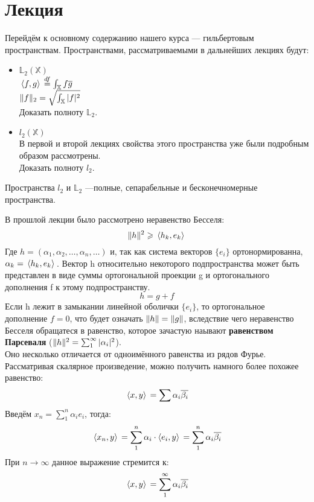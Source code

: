 	\section{Лекция}
	
	Перейдём к основному содержанию нашего курса --- гильбертовым пространствам. Пространствами, рассматриваемыми 
	в дальнейших лекциях будут:
	\begin{itemize}
		\item $\mathbb{L}_2(\mathbb{X})$ \\
		$\, \langle f, g \rangle \, \overset{df}{=} \int_{\mathbb{X}} f\overline{g}$ \\
		$\| f \|_2 = \sqrt{\int_{\mathbb{X}} |f|^2}$ \\
		\exc Доказать полноту $\mathbb{L}_2$.
		
		\item $l_2(\mathbb{X})$ \\
		В первой и второй лекциях свойства этого пространства уже были подробным образом рассмотрены. \\
		\exc Доказать полноту $l_2$.
	\end{itemize}
	Пространства $l_2$ и $\mathbb{L}_2$ ---полные, сепарабельные и бесконечномерные пространства.
	
	В прошлой лекции было рассмотрено неравенство Бесселя: \\
	$$\| h \|^2 \geqslant \, \langle h_k, e_k \rangle \,$$
	Где $h = (\alpha_1, \alpha_2, \ldots, \alpha_n, \ldots)$ и, так как система векторов $\{ e_i \}$ ортонормированна, 
	$\alpha_k = \, \langle h_k, e_k \rangle \,$. Вектор h относительно некоторого подпространства может быть представлен в виде суммы
	ортогональной проекции g и ортогонального дополнения f к этому подпространству. 
	$$h = g + f$$
	Если h лежит в замыкании линейной оболички $\{ e_i \}$, то ортогональное дополнение $f = 0$, что будет означать 
	$\| h \| = \| g \|$, вследствие чего неравенство Бесселя обращатеся в равенство, которое зачастую наывают 
	\textbf{равенством Парсеваля} ($\| h \|^2 = \sum_1^{\infty} |\alpha_i|^2$).\\
	Оно несколько отличается от одноимённого равенства из рядов Фурье. Рассматривая скалярное произведение, можно получить
	намного более похожее равенство:
	$$ \, \langle x, y \rangle \, = \sum \alpha_i \overline{\beta_i} $$
	Введём $x_n = \sum_1^n \alpha_i e_i$, тогда:
	$$ \, \langle x_n, y \rangle \, = \sum_1^n \alpha_i \cdot \! \, \langle e_i, y \rangle \, = \sum_1^n \alpha_i \overline{\beta_i}$$
	При $n \rightarrow \infty$ данное выражение стремится к:
	$$ \, \langle x, y \rangle \, = \sum_1^{\infty} \alpha_i \overline{\beta_i} $$
	

